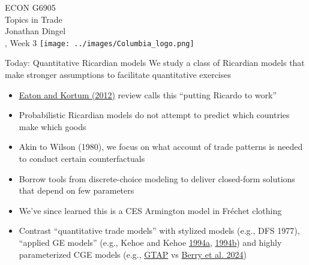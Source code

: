 \documentclass[11pt,notes=hide,aspectratio=169]{beamer}
\begin{document}
\begin{frame}[plain]
\begin{center}
\large
\textcolor{columbiadarkblue}{ECON G6905\\
Topics in Trade\\ 
Jonathan Dingel\\
\semester, Week 3}
\vfill 
\texttt{[image: ../images/Columbia\_logo.png]}
\end{center}
\end{frame}
\begin{frame}{Today: Quantitative Ricardian models}
We study a class of Ricardian models that make stronger assumptions to facilitate quantitative exercises
\begin{itemize}
	\item \href{https://www.aeaweb.org/articles?id=10.1257/jep.26.2.65}{Eaton and Kortum (2012)} review calls this ``putting Ricardo to work''
	\item Probabilistic Ricardian models do not attempt to predict which countries make which goods
	\item Akin to Wilson (1980), we focus on what account of trade patterns is needed to conduct certain counterfactuals
	\item Borrow tools from discrete-choice modeling to deliver closed-form solutions that depend on few parameters
	\item We've since learned this is a CES Armington model in Fr\'{e}chet clothing
	\item Contrast ``quantitative trade models'' with stylized models (e.g., DFS 1977), ``applied GE models'' (e.g., Kehoe and Kehoe \href{https://www.minneapolisfed.org/research/qr/qr1821.pdf}{1994a}, \href{https://www.minneapolisfed.org/research/qr/qr1822.pdf}{1994b}) and highly parameterized CGE models (e.g., \href{https://www.gtap.agecon.purdue.edu/models/current.asp}{GTAP} vs \href{https://tobin.yale.edu/research/biofuels-deforestation-and-gtap-model}{Berry et al. 2024})
\end{itemize}
\end{frame}
\end{document}

